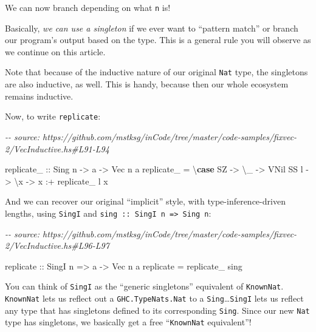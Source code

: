 \documentclass[]{article}
\newenvironment{Shaded}{}{}
\newcommand{\CommentTok}[1]{\textcolor[rgb]{0.38,0.63,0.69}{\textit{#1}}}
\newcommand{\DataTypeTok}[1]{\textcolor[rgb]{0.56,0.13,0.00}{#1}}
\newcommand{\FunctionTok}[1]{\textcolor[rgb]{0.02,0.16,0.49}{#1}}
\newcommand{\KeywordTok}[1]{\textcolor[rgb]{0.00,0.44,0.13}{\textbf{#1}}}
\newcommand{\NormalTok}[1]{#1}
\newcommand{\OperatorTok}[1]{\textcolor[rgb]{0.40,0.40,0.40}{#1}}
\newcommand{\OtherTok}[1]{\textcolor[rgb]{0.00,0.44,0.13}{#1}}
\begin{document}
We can now branch depending on what \texttt{n} is!

Basically, \emph{we can use a singleton} if we ever want to ``pattern match'' or
branch our program's output based on the type. This is a general rule you will
observe as we continue on this article.

Note that because of the inductive nature of our original \texttt{Nat} type, the
singletons are also inductive, as well. This is handy, because then our whole
ecosystem remains inductive.

Now, to write \texttt{replicate}:

\begin{Shaded}
\begin{Highlighting}[]
\CommentTok{{-}{-} source: https://github.com/mstksg/inCode/tree/master/code{-}samples/fixvec{-}2/VecInductive.hs\#L91{-}L94}

\OtherTok{replicate\_ ::} \DataTypeTok{Sing}\NormalTok{ n }\OtherTok{{-}\textgreater{}}\NormalTok{ a }\OtherTok{{-}\textgreater{}} \DataTypeTok{Vec}\NormalTok{ n a}
\NormalTok{replicate\_ }\OtherTok{=}\NormalTok{ \textbackslash{}}\KeywordTok{case}
    \DataTypeTok{SZ}   \OtherTok{{-}\textgreater{}}\NormalTok{ \textbackslash{}\_ }\OtherTok{{-}\textgreater{}} \DataTypeTok{VNil}
    \DataTypeTok{SS}\NormalTok{ l }\OtherTok{{-}\textgreater{}}\NormalTok{ \textbackslash{}x }\OtherTok{{-}\textgreater{}}\NormalTok{ x }\OperatorTok{:+}\NormalTok{ replicate\_ l x}
\end{Highlighting}
\end{Shaded}

And we can recover our original ``implicit'' style, with type-inference-driven
lengths, using \texttt{SingI} and
\texttt{sing\ ::\ SingI\ n\ =\textgreater{}\ Sing\ n}:

\begin{Shaded}
\begin{Highlighting}[]
\CommentTok{{-}{-} source: https://github.com/mstksg/inCode/tree/master/code{-}samples/fixvec{-}2/VecInductive.hs\#L96{-}L97}

\FunctionTok{replicate}\OtherTok{ ::} \DataTypeTok{SingI}\NormalTok{ n }\OtherTok{=\textgreater{}}\NormalTok{ a }\OtherTok{{-}\textgreater{}} \DataTypeTok{Vec}\NormalTok{ n a}
\FunctionTok{replicate} \OtherTok{=}\NormalTok{ replicate\_ sing}
\end{Highlighting}
\end{Shaded}

You can think of \texttt{SingI} as the ``generic singletons'' equivalent of
\texttt{KnownNat}. \texttt{KnownNat} lets us reflect out a
\texttt{GHC.TypeNats.Nat} to a \texttt{Sing}\ldots{}\texttt{SingI} lets us
reflect any type that has singletons defined to its corresponding \texttt{Sing}.
Since our new \texttt{Nat} type has singletons, we basically get a free
``\texttt{KnownNat} equivalent''!
\end{document}
